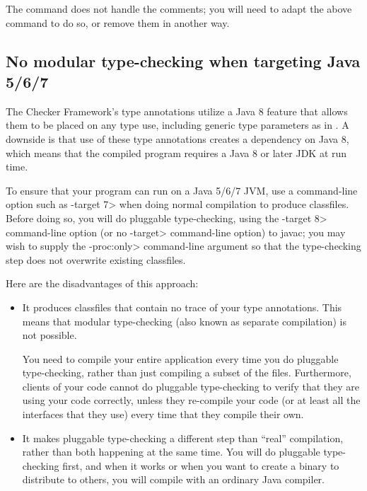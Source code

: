 The command does not handle the \code{>>>} comments; you will need to
adapt the above command to do so, or remove them in another way.


\subsection{No modular type-checking when targeting Java 5/6/7\label{no-modular-type-checking-java7-jvm}}

The Checker Framework's type annotations utilize a Java 8 feature that
allows them to be placed on any type use, including generic type parameters
as in .  A downside is that use of these type
annotations creates a dependency on Java 8, which means that the compiled
program requires a Java 8 or later JDK at run time.

To ensure that your program can run on a Java 5/6/7 JVM, use a command-line
option such as \<-target 7> when doing normal compilation to produce
classfiles.  Before doing so, you will do pluggable type-checking, using the
\<-target 8> command-line option (or no \<-target> command-line option) to
javac; you may wish to supply the \<-proc:only> command-line argument so
that the type-checking step does not overwrite existing classfiles.

Here are the disadvantages of this approach:

\begin{itemize}
\item
It produces classfiles that contain no trace of your type annotations.
This means that modular type-checking (also known as separate compilation)
is not possible.

You need to compile your entire application every time you
do pluggable type-checking, rather than just compiling a subset of the
files.  Furthermore, clients of your code cannot do pluggable
type-checking to verify that they are using your code correctly, unless
they re-compile your code (or at least all the interfaces that they use)
every time that they compile their own.

\item
It makes pluggable type-checking a
different step than ``real'' compilation, rather than both happening at the
same time.  You will do pluggable type-checking first, and when it works or
when you want to create a binary to distribute to others, you will compile
with an ordinary Java compiler.
\end{itemize}

